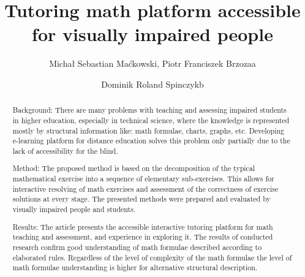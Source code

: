 \documentclass[12pt,1p]{elsarticle}
\begin{document}
\begin{frontmatter}
	
	
	
	\title{Tutoring math platform accessible for visually impaired people}
	
	
	\author{Michał Sebastian Maćkowski, Piotr Franciszek Brzozaa}
	\address{Computer Science Department, Silesian University of Technology, 16 Akademicka, 44-100 Gliwice, Poland}
		
	\author{Dominik Roland Spinczykb}
	\address{Biomedical Engineering Department, Silesian University of Technology, 40 Roosevelta, 41-800 Zabrze, Poland}
	
	\begin{abstract}
	
	Background: There are many problems with
teaching and assessing impaired students in higher education,
especially in technical science, where the knowledge is
represented mostly by structural information like: math
formulae, charts, graphs, etc. Developing e-learning platform for
distance education solves this problem only partially due to the
lack of accessibility for the blind.

	Method: The proposed method is based on the decomposition
of the typical mathematical exercise into a sequence of
elementary sub-exercises. This allows for interactive resolving of
math exercises and assessment of the correctness of exercise
solutions at every stage. The presented methods were prepared
and evaluated by visually impaired people and students.

	Results: The article presents the accessible interactive
tutoring platform for math teaching and assessment, and
experience in exploring it. The results of conducted research
confirm good understanding of math formulae described
according to elaborated rules. Regardless of the level of
complexity of the math formulae the level of math formulae
understanding is higher for alternative structural description.


\end{abstract}
\end{frontmatter}
\end{document}
